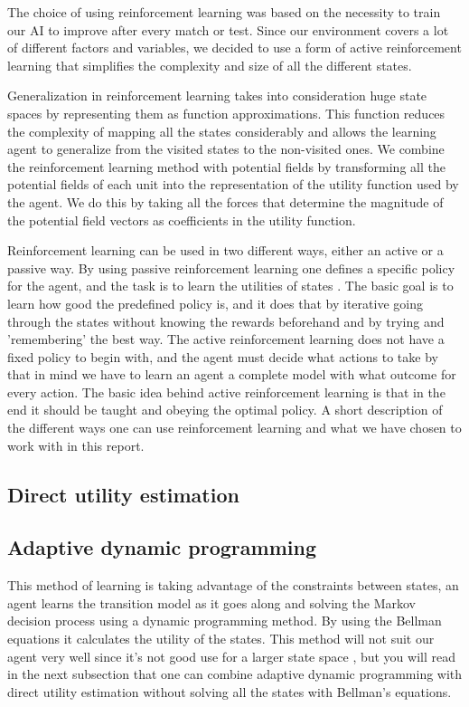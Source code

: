 	The choice of using reinforcement learning was based on the necessity to train our AI to improve after every match or test. Since our environment covers a lot of different factors and variables, we decided to use a form of active reinforcement learning that simplifies the complexity and size of all the different states. 

	Generalization in reinforcement learning takes into consideration huge state spaces by representing them as function approximations. This function reduces the complexity of mapping all the states considerably and allows the learning agent to generalize from the visited states to the non-visited ones. We combine the reinforcement learning method with potential fields by transforming all the potential fields of each unit into the representation of the utility function used by the agent. We do this by taking all the forces that determine the magnitude of the potential field vectors as coefficients in the utility function.
	
	
	Reinforcement learning can be used in two different ways, either an active or a passive way. By using passive reinforcement learning one defines a specific policy for the agent, and the task is to learn the utilities of states \cite{rl}. The basic goal is to learn how good the predefined policy is, and it does that by iterative going through the states without knowing the rewards beforehand and by trying and 'remembering' the best way. The active reinforcement learning does not have a fixed policy to begin with, and the agent must decide what actions to take \cite[p771]{rl} by that in mind we have to learn an agent a complete model with what outcome for every action. The basic idea behind active reinforcement learning is that in the end it should be taught and obeying the optimal policy.
A short description of the different ways one can use reinforcement learning and what we have chosen to work with in this report.

			
\subsection*{Direct utility estimation}



\subsection*{Adaptive dynamic programming}
This method of learning is taking advantage of the constraints between states, an agent learns the transition model as it goes along and solving the Markov decision process using a dynamic programming method. By using the Bellman equations it calculates the utility of the states. This method will not suit our agent very well since it's not good use for a larger state space \cite[p. 767]{rl}, but you will read in the next subsection that one can combine adaptive dynamic programming with direct utility estimation without solving all the states with Bellman's equations. 


